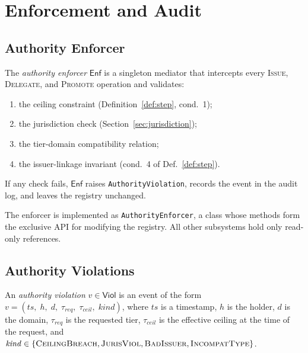 \documentclass[11pt]{article}
\newcommand{\Enf}{\mathsf{Enf}}             %
\newcommand{\Viol}{\mathsf{Viol}}           %
\begin{document}
\section{Enforcement and Audit}\label{sec:enforcement}

\subsection{Authority Enforcer}

\begin{definition}\label{def:enforcer}
The \emph{authority enforcer} $\Enf$ is a singleton mediator
that intercepts every \textsc{Issue}, \textsc{Delegate}, and
\textsc{Promote} operation and validates:
\begin{enumerate}[leftmargin=1.5em,itemsep=2pt]
  \item the ceiling constraint (Definition~\ref{def:step}, cond.~1);
  \item the jurisdiction check (Section~\ref{sec:jurisdiction});
  \item the tier-domain compatibility relation;
  \item the issuer-linkage invariant (cond.~4 of Def.~\ref{def:step}).
\end{enumerate}
If any check fails, $\Enf$ raises \texttt{AuthorityViolation},
records the event in the audit log, and leaves the registry unchanged.
\end{definition}

The enforcer is implemented as \texttt{AuthorityEnforcer}, a class
whose methods form the exclusive API for modifying the registry.
All other subsystems hold only read-only references.

\subsection{Authority Violations}

\begin{definition}\label{def:violation}
An \emph{authority violation} $v \in \Viol$ is an event of the form
$v = (\mathit{ts},\; h,\; d,\; \tau_{\mathit{req}},\;
       \tau_{\mathit{ceil}},\; \mathit{kind})$,
where $\mathit{ts}$ is a timestamp, $h$ is the holder, $d$ is the
domain, $\tau_{\mathit{req}}$ is the requested tier, $\tau_{\mathit{ceil}}$
is the effective ceiling at the time of the request, and
$\mathit{kind} \in \{\textsc{CeilingBreach}, \textsc{JurisViol},
  \textsc{BadIssuer}, \textsc{IncompatType}\}$.
\end{definition}
\end{document}
